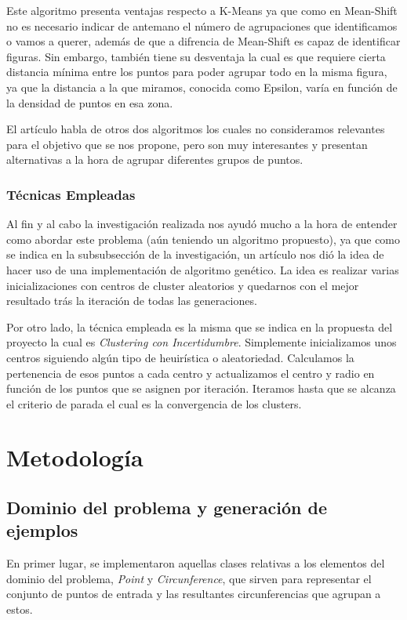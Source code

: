 \documentclass[conference,a4paper]{IEEEtran}
\begin{document}
Este algoritmo presenta ventajas respecto a K-Means ya que como en Mean-Shift no es necesario indicar de antemano el número de agrupaciones que identificamos o vamos a querer, además de que a difrencia de Mean-Shift es capaz de identificar figuras. Sin embargo, también tiene su desventaja la cual es que requiere cierta distancia mínima entre los puntos para poder agrupar todo en la misma figura, ya que la distancia a la que miramos, conocida como Epsilon, varía en función de la densidad de puntos en esa zona.

El artículo habla de otros dos algoritmos los cuales no consideramos relevantes para el objetivo que se nos propone, pero son muy interesantes y presentan alternativas a la hora de agrupar diferentes grupos de puntos.


\subsubsection{Técnicas Empleadas}

Al fin y al cabo la investigación realizada nos ayudó mucho a la hora de entender como abordar este problema (aún teniendo un algoritmo propuesto), ya que como se indica en la subsubsección de la investigación, un artículo nos dió la idea de hacer uso de una implementación de algoritmo genético. La idea es realizar varias inicializaciones con centros de cluster aleatorios y quedarnos con el mejor resultado trás la iteración de todas las generaciones.

Por otro lado, la técnica empleada es la misma que se indica en la propuesta del proyecto la cual es \textit{Clustering con Incertidumbre}. Simplemente inicializamos unos centros siguiendo algún tipo de heuirística o aleatoriedad. Calculamos la pertenencia de esos puntos a cada centro y actualizamos el centro y radio en función de los puntos que se asignen por iteración. Iteramos hasta que se alcanza el criterio de parada el cual es la convergencia de los clusters.

\section{Metodología}

\subsection{Dominio del problema y generación de ejemplos}

En primer lugar, se implementaron aquellas clases relativas a los elementos del dominio del problema, \textit{Point} y \textit{Circunference}, que sirven para representar el conjunto de puntos de entrada y las resultantes circunferencias que agrupan a estos.
\end{document}
